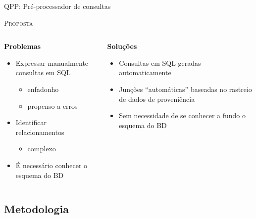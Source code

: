 \documentclass[12pt,compress,final]{beamer}
\begin{document}
\begin{frame}[t]{QPP: Pré-processador de consultas}

\centerline{\large{\textsc{Proposta}}}

\begin{columns}[t]
    
\begin{column}{0.5\textwidth}

\centerline{\textbf{Problemas}}

\begin{itemize}
\item Expressar manualmente consultas em SQL
    \begin{itemize}
    \item enfadonho
    \item propenso a erros
    \end{itemize}
\item Identificar relacionamentos
    \begin{itemize}
    \item complexo
    \end{itemize}
\item É necessário conhecer o esquema do BD
\end{itemize}

\end{column}

\vrule{}

\begin{column}{0.5\textwidth}

\centerline{\textbf{Soluções}}

\begin{itemize}
    \item Consultas em SQL geradas \alert{automaticamente}
    \item Junções ``automáticas'' baseadas no \alert{rastreio de dados de proveniência}
    \item Sem necessidade de se conhecer a fundo o esquema do BD
\end{itemize}

\end{column}

\end{columns}

\end{frame}


\subsection*{Metodologia}
\end{document}
